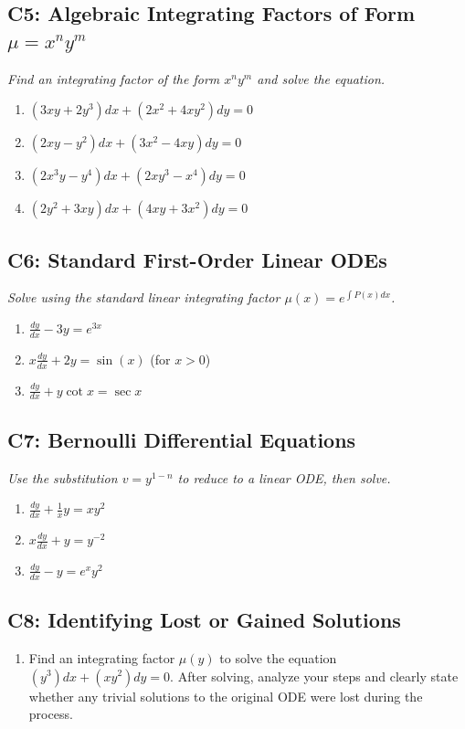 \documentclass[11pt]{article}
\begin{document}
\subsection*{C5: Algebraic Integrating Factors of Form $\mu = x^n y^m$}
\textit{Find an integrating factor of the form $x^n y^m$ and solve the equation.}

\begin{enumerate}[resume]
    \item $(3xy + 2y^3) dx + (2x^2 + 4xy^2) dy = 0$
    \item $(2xy - y^2) dx + (3x^2 - 4xy) dy = 0$
    \item $(2x^3 y - y^4) dx + (2xy^3 - x^4) dy = 0$
    \item $(2y^2 + 3xy) dx + (4xy + 3x^2) dy = 0$
\end{enumerate}

\subsection*{C6: Standard First-Order Linear ODEs}
\textit{Solve using the standard linear integrating factor $\mu(x) = e^{\int P(x)dx}$.}

\begin{enumerate}[resume]
    \item $\frac{dy}{dx} - 3y = e^{3x}$
    \item $x \frac{dy}{dx} + 2y = \sin(x)$ \quad (for $x > 0$)
    \item $\frac{dy}{dx} + y \cot x = \sec x$
\end{enumerate}

\subsection*{C7: Bernoulli Differential Equations}
\textit{Use the substitution $v = y^{1-n}$ to reduce to a linear ODE, then solve.}

\begin{enumerate}[resume]
    \item $\frac{dy}{dx} + \frac{1}{x}y = x y^2$
    \item $x \frac{dy}{dx} + y = y^{-2}$
    \item $\frac{dy}{dx} - y = e^x y^2$
\end{enumerate}

\subsection*{C8: Identifying Lost or Gained Solutions}
\begin{enumerate}[resume]
    \item Find an integrating factor $\mu(y)$ to solve the equation $(y^3) dx + (xy^2) dy = 0$. After solving, analyze your steps and clearly state whether any trivial solutions to the original ODE were lost during the process.
\end{enumerate}
\end{document}
